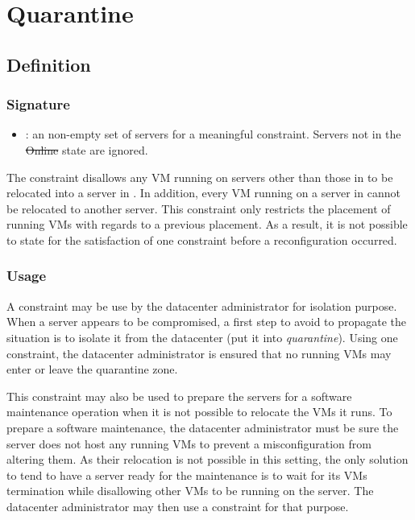 \section{Quarantine}

\subsection{Definition}

\subsubsection{Signature} 

\begin{itemize}
\item {} : an non-empty set of servers for a meaningful constraint. Servers not in the \st{Online} state are ignored.
\end{itemize}

The  constraint disallows any VM running on servers other than those in  to be relocated into a server in .
%
In addition, every VM running on a server in  cannot be relocated to another server.
%
This constraint only restricts the placement of running VMs with regards to a previous placement.
As a result, it is not possible to state for the satisfaction of one  constraint before a reconfiguration occurred.


\subsubsection{Usage}

A  constraint may be use by the datacenter administrator for isolation purpose.
When a server appears to be compromised, a first step to avoid to propagate
the situation is to isolate it from the datacenter (put it into \emph{quarantine}).
Using one  constraint, the datacenter administrator is ensured that
no running VMs may enter or leave the quarantine zone.

This constraint may also be used to prepare the servers for a software maintenance operation
when it is not possible to relocate the VMs it runs.
%
To prepare a software maintenance, the datacenter administrator must be sure the server
does not host any running VMs to prevent a misconfiguration from altering them. As their relocation
is not possible in this setting, the only solution to tend to have a server ready for the maintenance
is to wait for its VMs termination while disallowing other VMs to be running on the server.
The datacenter administrator may then use a  constraint for that purpose.


